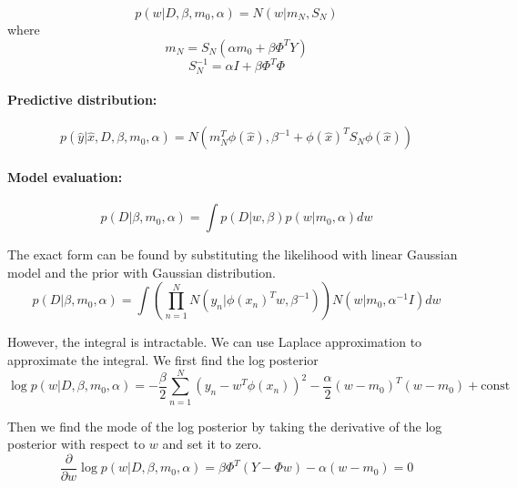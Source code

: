 \documentclass[a4paper,12pt]{article}
\newcommand{\pard}[2]{\frac{\partial #1}{\partial #2}}
\begin{document}
\begin{equation*}
	p(w|D, \beta, m_0, \alpha) = N(w|m_N, S_N)
\end{equation*}
where
\begin{equation*}
	m_N = S_N \left( \alpha m_0 + \beta \Phi^T Y \right)
\end{equation*}
\begin{equation*}
	S_N^{-1} = \alpha I + \beta \Phi^T \Phi
\end{equation*}

\paragraph{Predictive distribution:}
\begin{equation*}
	p(\hat{y}|\hat{x}, D, \beta, m_0, \alpha) = N(m_N^T \phi(\hat{x}), \beta^{-1} + \phi(\hat{x})^T S_N \phi(\hat{x}))
\end{equation*}

\paragraph{Model evaluation:}
\begin{equation*}
	p(D|\beta, m_0, \alpha) = \int p(D|w, \beta) p(w|m_0, \alpha) dw
\end{equation*}

The exact form can be found by substituting the likelihood with linear Gaussian model and the prior with Gaussian distribution.
\begin{equation*}
	p(D|\beta, m_0, \alpha) = \int \left( \prod_{n=1}^{N} N(y_n|\phi(x_n)^T w, \beta^{-1}) \right) N(w|m_0, \alpha^{-1} I) dw
\end{equation*}

However, the integral is intractable. We can use Laplace approximation to approximate the integral. We first find the log posterior
\begin{equation*}
	\log p(w|D, \beta, m_0, \alpha) = - \frac{\beta}{2} \sum_{n=1}^{N} (y_n - w^T \phi(x_n))^2 - \frac{\alpha}{2} (w - m_0)^T (w - m_0) + \text{const}
\end{equation*}

Then we find the mode of the log posterior by taking the derivative of the log posterior with respect to $w$ and set it to zero.
\begin{equation*}
	\pard{}{w} \log p(w|D, \beta, m_0, \alpha) = \beta \Phi^T (Y - \Phi w) - \alpha (w - m_0) = 0
\end{equation*}
\end{document}
